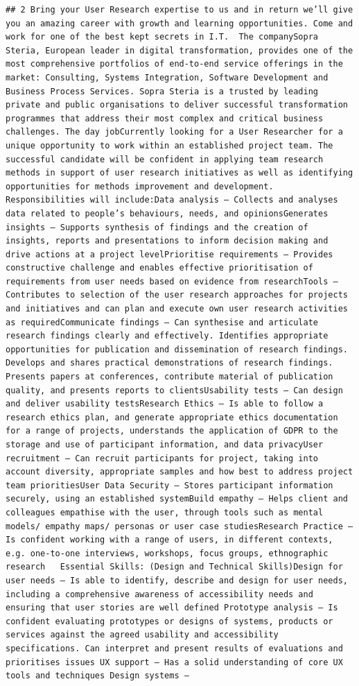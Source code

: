\documentclass[
]{article}
\begin{document}
\begin{verbatim}
## 2 Bring your User Research expertise to us and in return we’ll give you an amazing career with growth and learning opportunities. Come and work for one of the best kept secrets in I.T.  The companySopra Steria, European leader in digital transformation, provides one of the most comprehensive portfolios of end-to-end service offerings in the market: Consulting, Systems Integration, Software Development and Business Process Services. Sopra Steria is a trusted by leading private and public organisations to deliver successful transformation programmes that address their most complex and critical business challenges. The day jobCurrently looking for a User Researcher for a unique opportunity to work within an established project team. The successful candidate will be confident in applying team research methods in support of user research initiatives as well as identifying opportunities for methods improvement and development.   Responsibilities will include:Data analysis – Collects and analyses data related to people’s behaviours, needs, and opinionsGenerates insights – Supports synthesis of findings and the creation of insights, reports and presentations to inform decision making and drive actions at a project levelPrioritise requirements – Provides constructive challenge and enables effective prioritisation of requirements from user needs based on evidence from researchTools – Contributes to selection of the user research approaches for projects and initiatives and can plan and execute own user research activities as requiredCommunicate findings – Can synthesise and articulate research findings clearly and effectively. Identifies appropriate opportunities for publication and dissemination of research findings. Develops and shares practical demonstrations of research findings. Presents papers at conferences, contribute material of publication quality, and presents reports to clientsUsability tests – Can design and deliver usability testsResearch Ethics – Is able to follow a research ethics plan, and generate appropriate ethics documentation for a range of projects, understands the application of GDPR to the storage and use of participant information, and data privacyUser recruitment – Can recruit participants for project, taking into account diversity, appropriate samples and how best to address project team prioritiesUser Data Security – Stores participant information securely, using an established systemBuild empathy – Helps client and colleagues empathise with the user, through tools such as mental models/ empathy maps/ personas or user case studiesResearch Practice – Is confident working with a range of users, in different contexts, e.g. one-to-one interviews, workshops, focus groups, ethnographic research   Essential Skills: (Design and Technical Skills)Design for user needs – Is able to identify, describe and design for user needs, including a comprehensive awareness of accessibility needs and ensuring that user stories are well defined Prototype analysis – Is confident evaluating prototypes or designs of systems, products or services against the agreed usability and accessibility specifications. Can interpret and present results of evaluations and prioritises issues UX support – Has a solid understanding of core UX tools and techniques Design systems – 
\end{verbatim}
\end{document}

